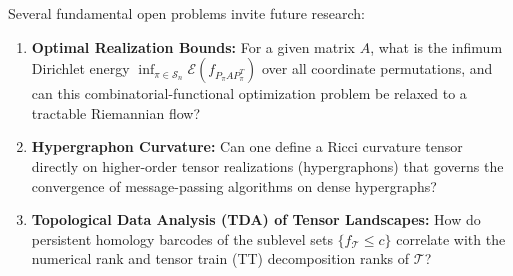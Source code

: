 \documentclass[11pt,a4paper,reqno]{amsart}
\theoremstyle{definition}
\numberwithin{equation}{section}
\begin{document}
Several fundamental open problems invite future research:
\begin{enumerate}
    \item \textbf{Optimal Realization Bounds:} For a given matrix $A$, what is the infimum Dirichlet energy $\inf_{\pi \in \mathcal{S}_n} \mathcal{E}(f_{P_\pi A P_\pi^T})$ over all coordinate permutations, and can this combinatorial-functional optimization problem be relaxed to a tractable Riemannian flow?
    \item \textbf{Hypergraphon Curvature:} Can one define a Ricci curvature tensor directly on higher-order tensor realizations (hypergraphons) that governs the convergence of message-passing algorithms on dense hypergraphs?
    \item \textbf{Topological Data Analysis (TDA) of Tensor Landscapes:} How do persistent homology barcodes of the sublevel sets $\{f_{\mathcal{T}} \le c\}$ correlate with the numerical rank and tensor train (TT) decomposition ranks of $\mathcal{T}$?
\end{enumerate}
\end{document}

